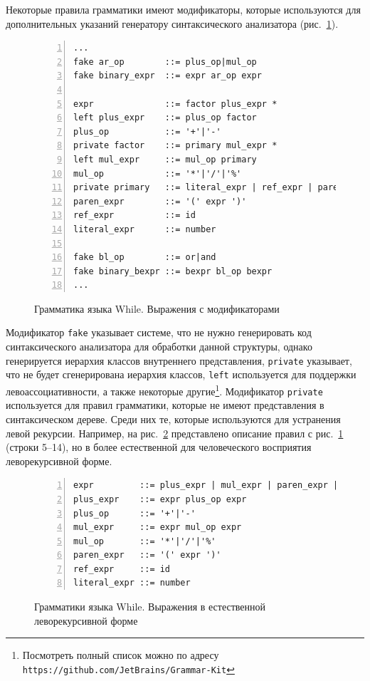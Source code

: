 Некоторые правила грамматики имеют модификаторы, которые используются для дополнительных указаний генератору синтаксического анализатора (рис.~\ref{ov:whileII}).
\begin{figure}[h]
    \begin{lstlisting}[numbers=left, numbersep=3pt, basicstyle=\ttfamily\small, numberstyle=\tiny, frame=bottom, language={}]
...
fake ar_op        ::= plus_op|mul_op
fake binary_expr  ::= expr ar_op expr 

expr              ::= factor plus_expr *
left plus_expr    ::= plus_op factor
plus_op           ::= '+'|'-'
private factor    ::= primary mul_expr *
left mul_expr     ::= mul_op primary
mul_op            ::= '*'|'/'|'%'
private primary   ::= literal_expr | ref_expr | paren_expr
paren_expr        ::= '(' expr ')'
ref_expr          ::= id
literal_expr      ::= number

fake bl_op        ::= or|and
fake binary_bexpr ::= bexpr bl_op bexpr
...
    \end{lstlisting}
    \caption{Грамматика языка While. Выражения с модификаторами}%
    \label{ov:whileII}
\end{figure}
\noindent
Модификатор \lstinline{fake} указывает системе, что не нужно генерировать код синтаксического анализатора для обработки данной структуры, однако генерируется иерархия классов внутреннего представления, \lstinline{private} указывает, что не будет сгенерирована иерархия классов, \lstinline{left} используется для поддержки левоассоциативности, а также некоторые другие\footnote{Посмотреть полный список можно по адресу \texttt{https://github.com/JetBrains/Grammar-Kit}}.
Модификатор \lstinline{private} используется для правил грамматики, которые не имеют представления в синтаксическом дереве.
Среди них те, которые используются для устранения левой рекурсии.
Например, на рис.~\ref{ov:whileExpr} представлено описание правил с рис.~\ref{ov:whileII} (строки 5--14), но в более естественной для человеческого восприятия леворекурсивной форме.
\begin{figure}[h]
    \begin{lstlisting}[numbers=left, numbersep=3pt, basicstyle=\ttfamily\small, numberstyle=\tiny, frame=bottom, language={}]
expr         ::= plus_expr | mul_expr | paren_expr | ref_expr | literal_expr
plus_expr    ::= expr plus_op expr
plus_op      ::= '+'|'-'
mul_expr     ::= expr mul_op expr
mul_op       ::= '*'|'/'|'%'
paren_expr   ::= '(' expr ')'
ref_expr     ::= id
literal_expr ::= number
    \end{lstlisting}
    \caption{Грамматики языка While. Выражения в естественной леворекурсивной форме}
    \label{ov:whileExpr}
\end{figure}
